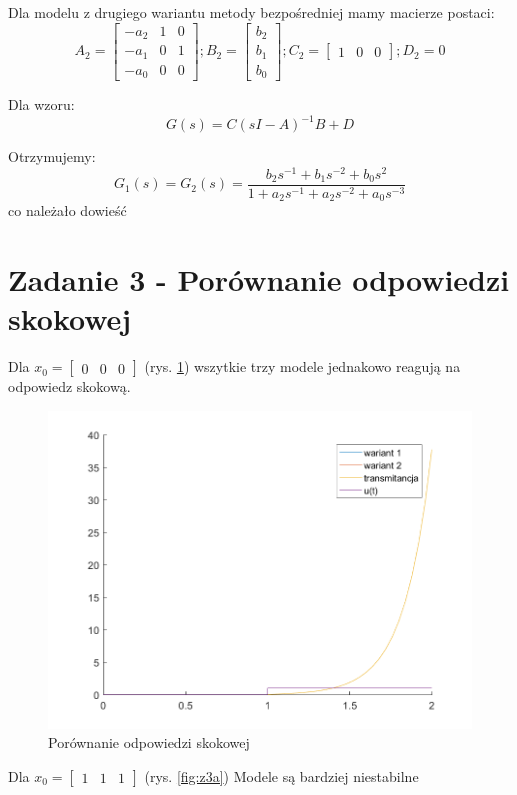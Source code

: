 \documentclass{article}
\begin{document}
Dla modelu z drugiego wariantu metody bezpośredniej mamy macierze postaci:
\[A_2 = \begin{bmatrix} -a_2 & 1 & 0\\ -a_1 & 0 & 1\\ -a_0 & 0 & 0 \end{bmatrix};
B_2 = \begin{bmatrix}  b_2\\ b_1\\ b_0 \end{bmatrix};
C_2 = \begin{bmatrix} 1 & 0 & 0 \end{bmatrix};
D_2 = 0
\]

Dla wzoru:
\[G(s) = C(sI - A)^{-1}B + D\]

Otrzymujemy:
\[G_1(s) = G_2(s) = \frac{b_2s^{-1} + b_1s^{-2} + b_0s^{2}}{1 + a_2s^{-1} +a_2s^{-2} +a_0s^{-3}}\]
co należało dowieść

\section{Zadanie 3 - Porównanie odpowiedzi skokowej}
Dla $x_0 = \begin{bmatrix}
0 & 0 & 0
\end{bmatrix}$ (rys. \ref{fig:z3})
wszytkie trzy modele jednakowo reagują na odpowiedz skokową. 

\begin{figure}[H]
\centering
\includegraphics[width=0.9\linewidth]{z3}
\caption{Porównanie odpowiedzi skokowej}
\label{fig:z3}
\end{figure}

Dla $x_0 = \begin{bmatrix}
1 & 1 & 1
\end{bmatrix}$ (rys. \ref{fig:z3a})
Modele są bardziej niestabilne
\end{document}
